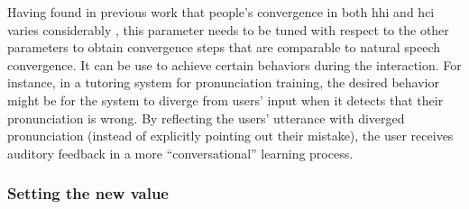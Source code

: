 Having found in previous work that people's convergence in both \ac{hhi} and \ac{hci} varies considerably \citep{Gessinger2017Interspeech}, this parameter needs to be tuned with respect to the other parameters to obtain convergence steps that are comparable to natural speech convergence.
It can be use to achieve certain behaviors during the interaction.
For instance, in a tutoring system for pronunciation training, the desired behavior might be for the system to diverge from users' input when it detects that their pronunciation is wrong.
By reflecting the users' utterance with diverged pronunciation (instead of explicitly pointing out their mistake), the user receives auditory feedback in a more \enquote{conversational} learning process.

%


\subsubsection{Setting the new value}
\label{subsubsec:setting_the_new_value}

